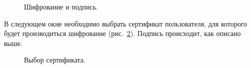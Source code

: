 \documentclass[10pt,a4paper,titlepage]{article}
\begin{document}
\begin{figure}[!h]	
\caption{Шифрование и подпись.}
\label{ris:image16}
\end{figure}

\pagebreak
В следующем окне необходимо выбрать сертификат пользователя, для которого будет производиться шифрование \mbox{(рис. \ref{ris:image17})}. Подпись происходит, как описано выше.

\begin{figure}[!h]	
\caption{Выбор сертификата.}
\label{ris:image17}
\end{figure}
\end{document}
